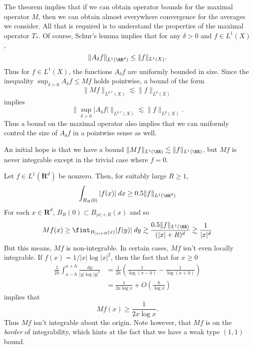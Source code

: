 The theorem implies that if we can obtain operator bounds for the maximal operator $M$, then we can obtain almost everywhere convergence for the averages we consider. All that is required is to understand the properties of the maximal operator $T_*$. Of course, Schur's lemma implies that for any $\delta > 0$ and $f \in L^1(X)$,
%
\[ \| A_\delta f \|_{L^1(\RR^d)} \leq \| f \|_{L^1(X)}. \]
%
Thus for $f \in L^1(X)$, the functions $A_\delta f$ are uniformly bounded in size. Since the inequality $\sup_{\delta > 0} A_\delta f \leq Mf$ holds pointwise, a bound of the form
%
\[ \| Mf \|_{L^{q,r}(X)} \lesssim \| f \|_{L^p(X)} \]
%
implies
%
\[ \| \sup_{\delta > 0} |A_\delta f| \|_{L^{q,r}(X)} \lesssim \| f \|_{L^p(X)}. \]
%
Thus a bound on the maximal operator also implies that we can uniformly control the size of $A_\delta f$ in a pointwise sense as well.

An initial hope is that we have a bound $\| Mf \|_{L^1(\RR)} \lesssim \| f \|_{L^1(\RR)}$, but $Mf$ is never integrable except in the trivial case where $f = 0$.

\begin{example}
  Let $f \in L^1(\mathbf{R}^d)$ be nonzero. Then, for suitably large $R \geq 1$,
  \[ \int_{B_R(0)} |f(x)|\; dx \geq 0.5 \| f \|_{L^1(\RR^d)} \]
  For each $x \in \mathbf{R}^d$, $B_R(0) \subset B_{|x|+R}(x)$ and so
  \[ Mf(x) \geq \fint_{B_{|x|+R}(x)} |f(y)|\; dy \gtrsim \frac{0.5 \| f \|_{L^1(\RR)}}{(|x| + R)^d} \gtrsim \frac{1}{|x|^d} \]
  But this means, $Mf$ is non-integrable. In certain cases, $Mf$ isn't even locally integrable. If $f(x) = 1/|x| \log|x|^2$, then the fact that for $x \geq 0$
  \begin{align*}
    \frac{1}{2h} \int_{x-h}^{x+h} \frac{dy}{|y| \log |y|^2} &= \frac{1}{2h} \left( \frac{1}{\log(x-h)} - \frac{1}{\log(x+h)} \right)\\
    &= \frac{1}{2x \log x} + O \left( \frac{h}{\log x} \right)
  \end{align*}
  implies that
  \[ Mf(x) \geq \frac{1}{2x \log x}. \]
  Thus $Mf$ isn't integrable about the origin. Note however, that $Mf$ is on the \emph{border} of integrability, which hints at the fact that we have a weak type $(1,1)$ bound.
\end{example}

